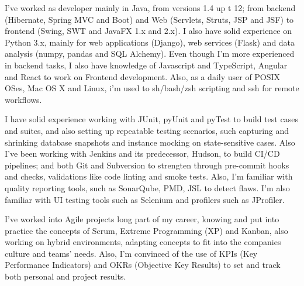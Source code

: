 




\begin{cvparagraph}
	I've worked as developer mainly in Java, from versions 1.4 up t 12; from backend (Hibernate, Spring MVC and Boot) and Web (Servlets, Struts, JSP and JSF) to frontend (Swing, SWT and JavaFX 1.x and 2.x). I also have solid experience on Python 3.x, mainly for web applications (Django), web services (Flask) and data analysis (numpy, pandas and SQL Alchemy). Even though I'm more experienced in backend tasks, I also have knowledge of Javascript and TypeScript, Angular and React to work on Frontend development. Also, as a daily user of POSIX OSes,
	Mac OS X and Linux, i'm used to sh/bash/zsh scripting and ssh for remote workflows.
\end{cvparagraph}


\begin{cvparagraph}
	I have solid experience working with JUnit, pyUnit and pyTest to build test cases and suites, and also setting up repeatable testing scenarios, such capturing and shrinking database snapshots and instance mocking on state-sensitive cases. Also I've been working with Jenkins and its predecessor, Hudson, to build CI/CD pipelines; and both Git and Subversion to strengten through pre-commit hooks and checks, validations like code linting and smoke tests. Also, I'm familiar with quality reporting tools, such as SonarQube, PMD, JSL to detect flaws. I'm also familiar with UI testing tools such as Selenium and profilers such as JProfiler.
\end{cvparagraph}


\begin{cvparagraph}
	I've worked into Agile projects long part of my career, knowing and put into practice the concepts of Scrum, Extreme Programming (XP) and Kanban, also working on hybrid environments, adapting concepts to fit into the companies culture and teams' needs. Also, I'm convinced of the use of KPIs (Key Performance Indicators) and OKRs (Objective Key Results) to set and track both personal and project results.
\end{cvparagraph}

